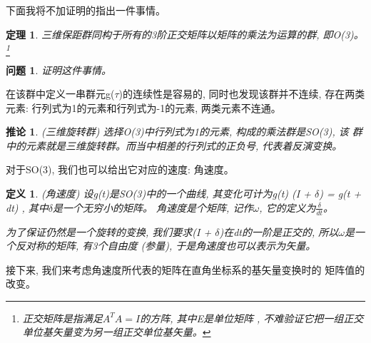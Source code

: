 \documentclass{ctexart}
\numberwithin{equation}{subsection}
\newtheorem{theorem}    {定理}
\numberwithin{theorem}{subsection}
\newtheorem{definition} {定义}
\numberwithin{definition}{subsection}
\numberwithin{proof}{subsection}
\numberwithin{lemma}{subsection}
\numberwithin{example}{subsection}
\numberwithin{remark}{subsection}
\newtheorem{corollary}  {推论}
\numberwithin{corollary}{subsection}
\numberwithin{exercise}{subsection}
\newtheorem{problem}    {问题}
\numberwithin{problem}{subsection}
\numberwithin{question}{section}
\numberwithin{method}{subsection}
\begin{document}
    下面我将不加证明的指出一件事情。

    \begin{theorem}
        \label{1.3 eq:3D Trotation group is O(3)}
        三维保距群同构于所有的3阶正交矩阵以矩阵的乘法为运算的群, 即O(3)。
        \footnote{正交矩阵是指满足\(A^T A = I\)的方阵, 其中E是单位矩阵
        , 不难验证它把一组正交单位基矢量变为另一组正交单位基矢量。}
    \end{theorem}

    \begin{problem}
        \label{1.3 pb:3D Trotation group is O(3)}
        证明这件事情。
    \end{problem}

    在该群中定义一串群元g(\(\tau\))的连续性是容易的, 同时也发现该群并不连续,
    存在两类元素: 行列式为1的元素和行列式为-1的元素, 两类元素不连通。

    \begin{corollary}
        \label{1.3 eq:3D rotation group is SO(3)}
        (三维旋转群) 选择O(3)中行列式为1的元素, 构成的乘法群是SO(3), 该
        群中的元素就是三维旋转群。而当中相差的行列式的正负号, 代表着反演变换。
    \end{corollary}

    对于SO(3), 我们也可以给出它对应的速度: 角速度。

    \begin{definition}
        \label{1.3 def:3D angular velocity}
        (角速度) 设g(t)是SO(3)中的一个曲线, 其变化可计为g(t) (I + \(\delta\)) = g(t + dt)
        , 其中\(\delta\)是一个无穷小的矩阵。
        角速度是个矩阵, 记作\(\omega\), 它的定义为\(\frac{\delta}{dt}\)。

        为了保证仍然是一个旋转的变换, 我们要求(I + \(\delta\))在dt的一阶是正交的, 
        所以\(\omega\)是一个反对称的矩阵, 有3个自由度 (参量), 于是角速度也可以表示为矢量。

    \end{definition}

    接下来, 我们来考虑角速度所代表的矩阵在直角坐标系的基矢量变换时的
    矩阵值的改变。
\end{document}
